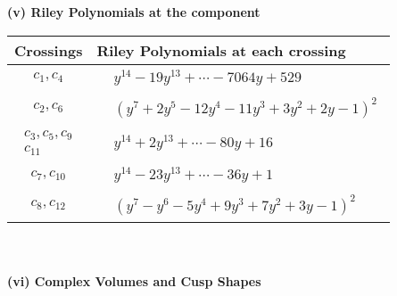 \documentclass[1p]{elsarticle_modified}
\theoremstyle{definition}
\begin{document}
\newpage\renewcommand{\arraystretch}{1}
\flushleft \textbf{(v) Riley Polynomials at the component}\newline \\
\begin{tabular}{m{50pt}|m{274pt}}
Crossings & \hspace{64pt}Riley Polynomials at each crossing \\
\hline $$\begin{aligned}c_{1},c_{4}\end{aligned}$$&$\begin{aligned}
&y^{14}-19 y^{13}+\cdots-7064 y+529
\end{aligned}$\\
\hline $$\begin{aligned}c_{2},c_{6}\end{aligned}$$&$\begin{aligned}
&(y^7+2 y^5-12 y^4-11 y^3+3 y^2+2 y-1)^2
\end{aligned}$\\
\hline $$\begin{aligned}c_{3},c_{5},c_{9}\\c_{11}\end{aligned}$$&$\begin{aligned}
&y^{14}+2 y^{13}+\cdots-80 y+16
\end{aligned}$\\
\hline $$\begin{aligned}c_{7},c_{10}\end{aligned}$$&$\begin{aligned}
&y^{14}-23 y^{13}+\cdots-36 y+1
\end{aligned}$\\
\hline $$\begin{aligned}c_{8},c_{12}\end{aligned}$$&$\begin{aligned}
&(y^7- y^6-5 y^4+9 y^3+7 y^2+3 y-1)^2
\end{aligned}$\\
\hline
\end{tabular}\\~\\
\newpage\flushleft \textbf{(vi) Complex Volumes and Cusp Shapes}
\end{document}
